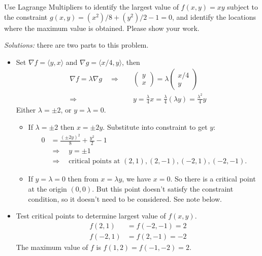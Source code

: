     \fi
    
\fi




\ifnum {}

    \question[4] Use Lagrange Multipliers to identify the largest value of $f(x,y)=xy$ subject to the constraint $\displaystyle g(x,y) = (x^2)/8 + (y^2)/2 - 1 = 0$, and identify the locations where the maximum value is obtained. Please show your work. 

    \ifnum {} {\color{DarkBlue} \textit{Solutions:} there are two parts to this problem. 
    \begin{itemize}
        \item Set $\nabla f = \langle y,x \rangle$ and $\nabla g = \langle x/4, y \rangle$, then 
    \begin{align*}
    \nabla f = \lambda \nabla g \quad \Rightarrow & \quad 
    \begin{pmatrix} y\\x\end{pmatrix} = \lambda \begin{pmatrix} x/4\\y\end{pmatrix} \\  \Rightarrow & \quad y = \frac{\lambda}{4}x = \frac{\lambda}{4} (\lambda y) = \frac{\lambda^2}{4} y 
    \end{align*}
    Either $\lambda = \pm 2$, or $y=\lambda = 0$. 
    \begin{itemize}
        \item If $\lambda = \pm 2$ then $x=\pm2y$. Substitute into constraint to get $y$:
    \begin{align*}
        0&=\frac{ (\pm 2y)^2}{8} + \frac{y^2}{2} -1 \\
        & \Rightarrow \quad y= \pm 1 \\
        & \Rightarrow \quad \text{critical points at } (2,1), (2,-1), (-2,1), (-2,-1).
    \end{align*}
    \item If $y=\lambda =0$ then from $x=\lambda y$, we have $x=0$. So there is a critical point at the origin $(0,0)$. But this point doesn't satisfy the constraint condition, so it doesn't need to be considered. See note below.
    \end{itemize}
    
    \item Test critical points to determine largest value of $f(x,y)$. 
    \begin{align}
        f(2,1) & = f(-2,-1) = 2 \\
        f(-2,1) &= f(2,-1) = -2
    \end{align}
    The maximum value of $f$ is $f(1,2)=f(-1,-2) = 2$. 
    \end{itemize}
    
}
